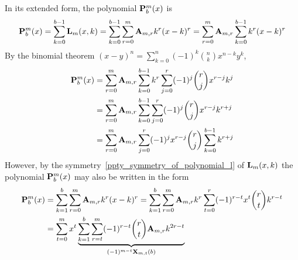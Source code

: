 In its extended form, the polynomial ${\mathbf{P}}\sp{m} \sb{b}(x)$ is
\begin{equation*}
    \begin{split}
        {\mathbf{P}}\sp{m} \sb{b}(x) = \sum_{k=0}^{b-1} {\mathbf{L}}\sb{m}(x,k)
        =\sum_{k=0}^{b-1} \sum_{r=0}^{m} {\mathbf{A}} \sb{m,r} k^r(x-k)^r
        =\sum_{r=0}^{m} {\mathbf{A}} \sb{m,r} \sum_{k=0}^{b-1} k^r(x-k)^r \\
    \end{split}
\end{equation*}
By the binomial theorem $(x-y)^n = \sum_{k=0}^{n} (-1)^{k} \binom{n}{k} x^{n-k} y^{k}$,
\begin{equation*}
    \begin{split}
        {\mathbf{P}}\sp{m} \sb{b}(x)
        &=\sum_{r=0}^{m} {\mathbf{A}} \sb{m,r} \sum_{k=0}^{b-1} k^r \sum_{j=0}^{r} (-1)^{j} \binom{r}{j} x^{r-j} k^{j} \\
        &=\sum_{r=0}^{m} {\mathbf{A}} \sb{m,r} \sum_{k=0}^{b-1} \sum_{j=0}^{r} (-1)^{j} \binom{r}{j} x^{r-j} k^{r+j} \\
        &=\sum_{r=0}^{m} {\mathbf{A}} \sb{m,r} \sum_{j=0}^{r} (-1)^{j} x^{r-j} \binom{r}{j} \sum_{k=0}^{b-1} k^{r+j} \\
    \end{split}
\end{equation*}
However, by the symmetry~\eqref{ppty_symmetry_of_polynomial_l} of ${\mathbf{L}}\sb{m}(x,k)$ the polynomial
${\mathbf{P}}\sp{m} \sb{b}(x)$ may also be written in the form
\begin{equation*}
    \begin{split}
        {\mathbf{P}}\sp{m} \sb{b}(x)
        &=\sum_{k=1}^{b} \sum_{r=0}^{m} {\mathbf{A}} \sb{m,r} k^r(x-k)^r
        =\sum_{k=1}^{b} \sum_{r=0}^{m} {\mathbf{A}} \sb{m,r} k^r \sum_{t=0}^{r} (-1)^{r-t} x^t \binom{r}{t} k^{r-t} \\
        &=\sum_{t=0}^{m} x^t
        \underbrace{\sum_{k=1}^{b} \sum_{r=t}^{m} (-1)^{r-t} \binom{r}{t} {\mathbf{A}} \sb{m,r} k^{2r-t}}_{(-1)^{m-t} {\mathbf{X}}\sb{m,t} (b)}
    \end{split}
\end{equation*}
